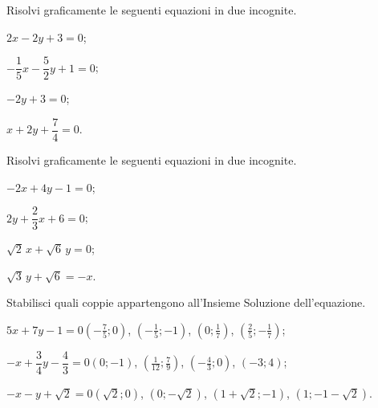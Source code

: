 \begin{esercizio}
 \label{ese:22.4}
Risolvi graficamente le seguenti equazioni in due incognite.
\begin{multicols}{2}
 \begin{enumeratea}
\spazielenx
\item $2x-2y+3=0$;
\item $-{\dfrac{1}{5}}x-\dfrac{5}{2}y+1=0$;
\item $-2y+3=0$;
\item $x+2y+\dfrac{7}{4}=0$.
\end{enumeratea}
\end{multicols}
\end{esercizio}

\begin{esercizio}
 \label{ese:22.5}
Risolvi graficamente le seguenti equazioni in due incognite.
\begin{multicols}{2}
 \begin{enumeratea}
\spazielenx
\item $-2x+4y-1=0$;
\item $2y+\dfrac{2}{3}x+6=0$;
\item $\sqrt{2}\,x+\sqrt{6}\,y=0$;
\item $\sqrt{3}\,y+\sqrt{6}=-x$.
 \end{enumeratea}
\end{multicols}
\end{esercizio}

\begin{esercizio}
 \label{ese:22.6}
 Stabilisci quali coppie appartengono all'Insieme Soluzione dell'equazione.
\TabPositions{4cm}
\begin{enumeratea}
\item $5x+7y-1=0$\tab$\left(-\frac{7}{5};0\right)$, $\left(-\frac{1}{5};-1\right)$, $\left(0;\frac{1}{7}\right)$, $\left(\frac{2}{5};-\frac{1}{7}\right)$;
\item $-x+\dfrac{3}{4}y-\dfrac{4}{3}=0$\tab$(0;-1)$, $\left(\frac{1}{12};\frac{7}{9}\right)$, $\left(-\frac{4}{3};0\right)$, $(-3;4)$;
\item $-x-y+\sqrt{2}=0$\tab$\left(\sqrt{2};0\right)$, $\left(0;-\sqrt{2}\right)$, $\left(1+\sqrt{2};-1\right)$, $\left(1;-1-\sqrt{2}\right)$.
\end{enumeratea}
\end{esercizio}


